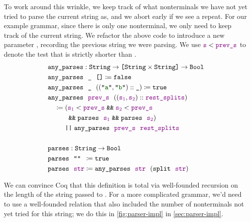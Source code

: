     To work around this wrinkle, we keep track of what nonterminals we have not yet tried to parse the current string as, and we abort early if we see a repeat.  %
    For our example grammar, since there is only one nonterminal, we only need to keep track of the current string.  We refactor the above code to introduce a new parameter , recording the previous string we were parsing.  We use $\textcolor{violet}{\texttt{s}} < \textcolor{violet}{\texttt{prev\_s}}$ to denote the test that  is strictly shorter than . \label{sec:valid-param-parser}
    \begin{align*}
      & \fname{any\_parses} \oftypesep \String \typeto \typelistp{\typeprod{\String}{\String}} \typeto \Bool \\
      & \fname{any\_parses}~~\termhole~~\nil \defeq \false \\
      & \fname{any\_parses}~~\termhole~~(\cons{(\str{a}, \str{b})}{\termhole}) \defeq \true \\
      & \fname{any\_parses}~~\farg{prev\_s}~~(\cons{(\farg{s$_1$}, \farg{s$_2$})}{\farg{rest\_splits}}) \\
      & \quad \defeq \left( \farg{s$_1$} < \farg{prev\_s} \booland \farg{s$_2$} < \farg{prev\_s} \right. \\
      & \phantom{\quad \defeq \left(\right.} \left.\booland \fname{parses}~~\farg{s$_1$} \booland \fname{parses}~~\farg{s$_2$}\right) \\
      & \phantom{\quad \defeq {}} \boolor \fname{any\_parses}~~\farg{prev\_s}~~\farg{rest\_splits} \\
      \\
      & \fname{parses} \oftypesep \String \typeto \Bool \\
      & \fname{parses}~~\aswidthof{\str{}}{\farg{str}} \defeq \true \\
      & \fname{parses}~~\farg{str} \defeq \fname{any\_parses}~~\farg{str}~~(\fname{split}~~\farg{str})
    \end{align*}

    We can convince Coq that this definition is total via well-founded recursion on the length of the string passed to .  For a more complicated grammar, we'd need to use a well-founded relation that also included the number of nonterminals not yet tried for this string; we do this in \autoref{fig:parser-impl} in \autoref{sec:parser-impl}.


